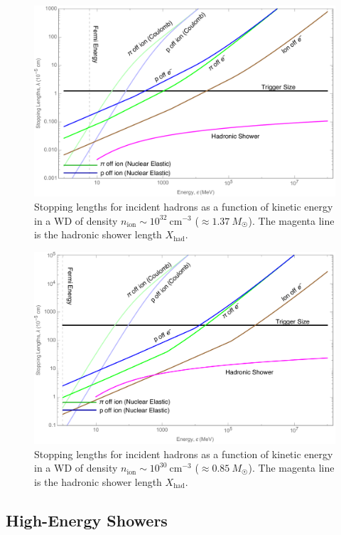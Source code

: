 \documentclass[twocolumn, preprintnumbers,amsmath,amssymb,prd, superscriptaddress]{revtex4}
\begin{document}
\begin{figure}
\includegraphics[scale=.3]{SPhighHad.pdf}
\caption{Stopping lengths for incident hadrons as a function of kinetic energy in a WD of density $n_\text{ion} \sim 10^{32}~\text{cm}^{-3}$ ($\approx 1.37 ~M_{\astrosun}$). 
The magenta line is the hadronic shower length $X_\text{had}$.}
\label{fig:SPhighHad}
\end{figure}

\begin{figure}
\includegraphics[scale=.3]{SPlowHad.pdf}
\caption{Stopping lengths for incident hadrons as a function of kinetic energy in a WD of density $n_\text{ion} \sim 10^{30}~\text{cm}^{-3}$ ($\approx 0.85 ~M_{\astrosun}$).
The magenta line is the hadronic shower length $X_\text{had}$.}
\label{fig:SPlowHad}
\end{figure}

\subsection{High-Energy Showers}
\end{document}
